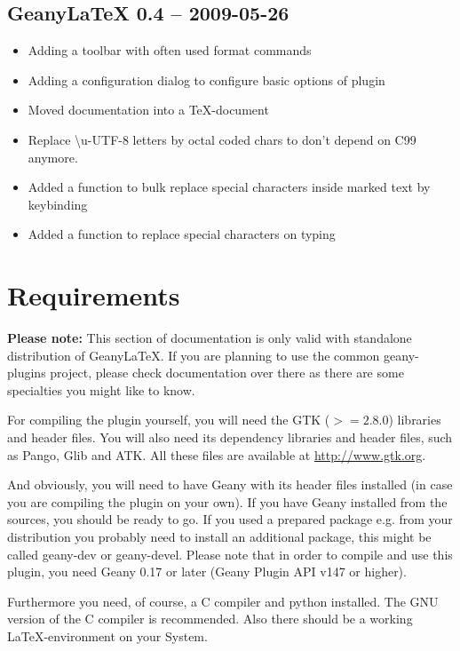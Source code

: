 \documentclass[%
a4paper,%
10pt,%
oneside,%
DIV18,
headsepline,
plainheadsepline,
footsepline,
plainfootsepline,
bibtotoc,%
liststotoc,%
BCOR12mm,%
halfparskip,%
openany,%
]{scrartcl}
\begin{document}
\subsection*{GeanyLaTeX{} 0.4 -- 2009-05-26}
\begin{itemize}
	\item Adding a toolbar with often used format commands
	\item Adding a configuration dialog to configure basic options of plugin
	\item Moved documentation into a \TeX{}-document
	\item Replace \textbackslash{}u-UTF-8 letters by octal coded chars to
		  don't depend on C99 anymore.
	\item Added a function to bulk replace special characters
    	  inside marked text by keybinding
	\item Added a function to replace special characters on typing
\end{itemize}

\section{Requirements}

\small{\textbf{Please note:} This section of documentation is only valid with standalone distribution of Geany\LaTeX{}. If you are planning to use the common geany-plugins project, please check documentation over there as there are some specialties you might like to know.}

For compiling the plugin yourself, you will need the GTK ($>= 2.8.0$)
libraries and header files. You will also need its dependency
libraries and header files, such as Pango, Glib and ATK. All these
files are available at \url{http://www.gtk.org}.

And obviously, you will need to have Geany with its header files
installed (in case you are compiling the plugin on your own). If you
have Geany installed from the sources, you should be ready to go. If
you used a prepared package e.g. from your distribution you probably
need to install an additional package, this might be called geany-dev
or geany-devel. Please note that in order to compile and use this
plugin, you need Geany 0.17 or later (Geany Plugin API v147 or higher).

Furthermore you need, of course, a C compiler and python installed. The
GNU version of the C compiler is recommended. Also there should be a
working \LaTeX-environment on your System.
\end{document}
